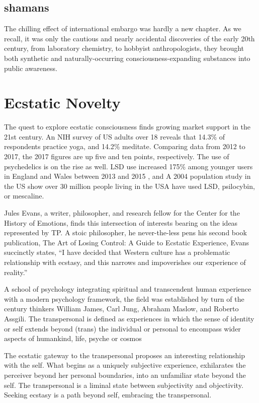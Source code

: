 \documentclass{UIdahoMastersThesis}
\begin{document}
\subsection{shamans}

The chilling effect of international embargo was hardly a new chapter. As we recall, it was only the cautious and nearly accidental discoveries of the early 20th century, from laboratory chemistry, to hobbyist anthropologists, they brought both synthetic and naturally-occurring consciousness-expanding substances into public awareness. 

\section{Ecstatic Novelty}

The quest to explore ecstatic consciousness finds growing market support in the 21st century. An NIH survey of US adults over 18 reveals that 14.3\% of respondents practice yoga, and 14.2\% meditate.  Comparing data from 2012 to 2017, the 2017 figures are up five and ten points, respectively. The use of psychedelics is on the rise as well. LSD use increased 175\% among younger users in England and Wales between 2013 and 2015 \cite{gayle_ecstasy_2015}, and A 2004 population study in the US show over 30 million people living in the USA have used LSD, psilocybin, or mescaline. \cite{krebs_psychedelics_2013}

Jules Evans, a writer, philosopher, and research fellow for the Center for the History of Emotions, finds this intersection of interests bearing on the ideas represented by \ac{TP}. A stoic philosopher, he never-the-less pens his second book publication, The Art of Losing Control: A Guide to Ecstatic Experience, Evans succinctly states, \enquote{I have decided that Western culture has a problematic relationship with ecstasy, and this narrows and impoverishes our experience of reality.}

A school of psychology integrating spiritual and transcendent human experience with a modern psychology framework, the field was established by turn of the century thinkers William James, Carl Jung, Abraham Maslow, and Roberto Assgili. The transpersonal is defined as experiences in which the sense of identity or self extends beyond (trans) the individual or personal to encompass wider aspects of humankind, life, psyche or cosmos \cite{calijornia1993transpersonal}

The ecstatic gateway to the transpersonal proposes an interesting relationship with the self. What begins as a uniquely subjective experience, exhilarates the perceiver beyond her personal boundaries, into an unfamiliar state beyond the self. The transpersonal is a liminal state between subjectivity and objectivity. Seeking ecstasy is a path beyond self, embracing the transpersonal.
\end{document}
